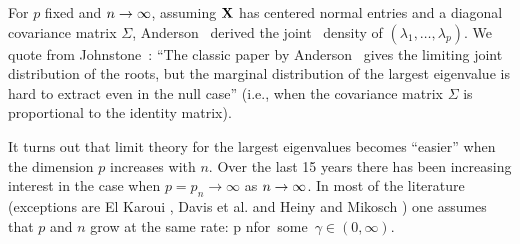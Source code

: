 For $p$ fixed and $n \to \infty$, assuming
${\mathbf X}$ has centered normal entries and a diagonal covariance matrix $\Sigma$,
Anderson~\cite{anderson:1963}  derived the joint \asy\ density of $(\lambda_1, \ldots, \lambda_p)$.
We quote from Johnstone~\cite{johnstone:2001}:
``The classic paper by Anderson~\cite{anderson:1963} gives the limiting joint distribution of the roots, but the
marginal distribution of the largest eigenvalue is hard to extract even in the null case'' (i.e., when the covariance matrix $\Sigma$ is
proportional to the identity matrix).

It turns out that limit theory for the largest eigenvalues becomes ``easier''
when the dimension $p$ increases with $n$.
Over the last 15 years there has been increasing interest in the case when $p=p_n\to\infty$ as $n \to \infty$. In most of
the literature (exceptions are El Karoui \cite{elkaroui:2003}, Davis et al. \cite{davis:mikosch:pfaffel:2016,davis:pfaffel:stelzer:2014} and Heiny and Mikosch
\cite{heiny:mikosch:2016})
one assumes that $p$ and $n$ grow at the same rate:
\beam\label{eq:gamma}
\dfrac p n\to \gamma\qquad \mbox{for some $\gamma \in (0,\infty)$.}
\eeam

